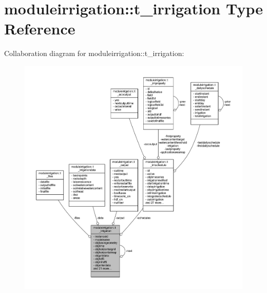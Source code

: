 \hypertarget{structmoduleirrigation_1_1t__irrigation}{}\section{moduleirrigation\+:\+:t\+\_\+irrigation Type Reference}
\label{structmoduleirrigation_1_1t__irrigation}


Collaboration diagram for moduleirrigation\+:\+:t\+\_\+irrigation\+:\nopagebreak
\begin{figure}[H]
\begin{center}
\leavevmode
\includegraphics[width=350pt]{structmoduleirrigation_1_1t__irrigation__coll__graph}
\end{center}
\end{figure}
